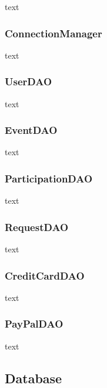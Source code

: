 \documentclass[11pt]{article}
\begin{document}
            text

            \subsubsection{ConnectionManager} \label{subsubsec:connection-manager}

                text

            \subsubsection{UserDAO} \label{subsubsec:user-dao}

                text

            \subsubsection{EventDAO} \label{subsubsec:event-dao}

                text

            \subsubsection{ParticipationDAO} \label{subsubsec:participation-dao}

                text

            \subsubsection{RequestDAO} \label{subsubsec:request-dao}

                text

            \subsubsection{CreditCardDAO} \label{subsubsec:credit-card-dao}

                text

            \subsubsection{PayPalDAO} \label{subsubsec:paypal-dao}

                text

        \subsection{Database} \label{subsec:database}
\end{document}
